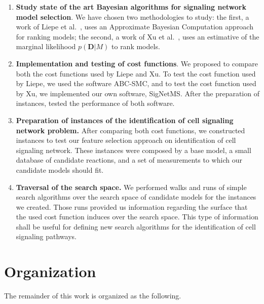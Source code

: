 \begin{enumerate}
    \item{{\bf Study state of the art Bayesian algorithms for signaling
        network model selection}. We have chosen two methodologies to
        study: the first, a work of Liepe et al.~\cite{Liepe2014}, uses
        an Approximate Bayesian Computation approach for ranking models;
        the second, a work of Xu et al.~\cite{Xura20}, uses an
        estimative of the marginal likelihood $p({\bm D}| M)$ to rank
        models.}
    \item{{\bf Implementation and testing of cost functions}. We proposed
        to compare both the cost functions used by Liepe and Xu. To test
        the cost function used by Liepe, we used the software
        ABC-SMC, and to test the cost function used by Xu, we
        implemented our own software, SigNetMS. After the preparation of
        instances, tested the performance of both software.}
    \item{{\bf Preparation of instances of the identification of cell
        signaling network problem.} After comparing both cost functions,
        we constructed instances to test our feature selection
        approach on identification of cell signaling network. These
        instances were composed by a base model, a small database of
        candidate reactions, and a set of measurements to which our
        candidate models should fit.}
    \item{{\bf Traversal of the search space.} We performed
        walks and runs of simple search algorithms over the search space
        of candidate models for the instances we created. Those runs
        provided us information regarding the surface that the used cost 
        function induces over the search space. This type of information
        shall be useful for defining new search algorithms for the
        identification of cell signaling pathways.}
\end{enumerate}

\section{Organization}

The remainder of this work is organized as the following.

